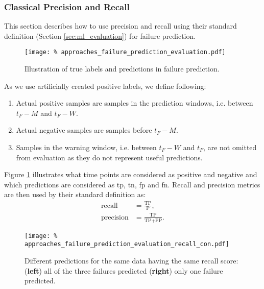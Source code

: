 \subsubsection{Classical Precision and Recall}
\label{sec:approaches_failure_prediction_evaluation_classical_metrics}

This section describes how to use precision and recall using their standard definition (Section \ref{sec:ml_evaluation}) for failure prediction.

\begin{figure}
    \texttt{[image: \%
        approaches\_failure\_prediction\_evaluation.pdf]}
    \centering
    \caption{Illustration of true labels and predictions in failure prediction.}
    \label{fig:approaches_failure_prediction_evaluation}
\end{figure}

As we use artificially created positive labels, we define following: 
\begin{enumerate}
    \item Actual positive samples are samples in the prediction windows, i.e. between $t_F - M$ and $t_F - W$.
    \item Actual negative samples are samples before $t_F - M$.
    \item Samples in the warning window, i.e. between $t_F - W$ and $t_F$, are not omitted from evaluation as they do not represent useful predictions.
\end{enumerate}

Figure \ref{fig:approaches_failure_prediction_evaluation} illustrates what time points are considered as positive and negative and which predictions are considered as \acrshort{tp}, \acrshort{tn}, \acrshort{fp} and \acrshort{fn}.
Recall and precision metrics are then used by their standard definition as:
\begin{align*}
    \text{recall} &= \frac{\text{TP}}{\text{P}},\\
    \text{precision} &= \frac{\text{TP}}{\text{TP} + \text{FP}}.
\end{align*}

\begin{figure}[hbt!]
    \texttt{[image: \%
        approaches\_failure\_prediction\_evaluation\_recall\_con.pdf]}
    \centering
    \caption{Different predictions for the same data having the same recall score:
             (\textbf{left}) all of the three failures predicted
             (\textbf{right}) only one failure predicted.}
    \label{fig:approaches_failure_prediction_evaluation_recall_con}
\end{figure}

